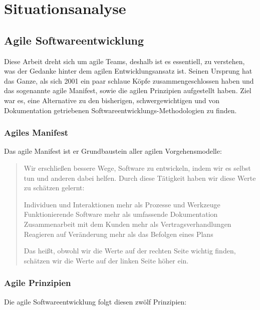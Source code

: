 \chapter{Situationsanalyse}

\section{Agile Softwareentwicklung}

Diese Arbeit dreht sich um agile Teams, deshalb ist es essentiell, zu verstehen, was der Gedanke hinter dem agilen Entwicklungsansatz ist.
Seinen Ursprung hat das Ganze, als sich 2001 ein paar schlaue Köpfe zusammengeschlossen haben und das sogenannte agile Manifest, sowie die agilen Prinzipien aufgestellt haben.
Ziel war es, eine Alternative zu den bisherigen, schwergewichtigen und von Dokumentation getriebenen Softwareentwicklungs-Methodologien zu finden.

\subsection{Agiles Manifest}

Das agile Manifest ist er Grundbaustein aller agilen Vorgehensmodelle:

\begin{quote}Wir erschließen bessere Wege, Software zu entwickeln,
indem wir es selbst tun und anderen dabei helfen.
Durch diese Tätigkeit haben wir diese Werte zu schätzen gelernt: \newline
\begin{center}
Individuen und Interaktionen mehr als Prozesse und Werkzeuge \newline
Funktionierende Software mehr als umfassende Dokumentation \newline
Zusammenarbeit mit dem Kunden mehr als Vertragsverhandlungen \newline
Reagieren auf Veränderung mehr als das Befolgen eines Plans \newline
\end{center}
Das heißt, obwohl wir die Werte auf der rechten Seite wichtig finden,
schätzen wir die Werte auf der linken Seite höher ein.\end{quote}\cite{agile_manifest}

\subsection{Agile Prinzipien}

Die agile Softwareentwicklung folgt diesen zwölf Prinzipien:

